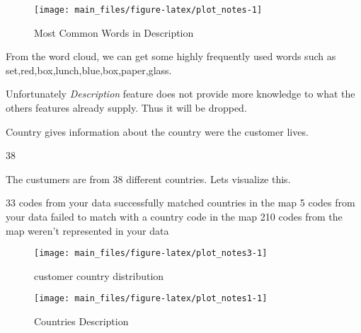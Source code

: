 \begin{Schunk}
\begin{figure}[H]

{\centering \texttt{[image: main\_files/figure-latex/plot\_notes-1]} 

}

\caption[Most Common Words in Description]{Most Common Words in Description}\label{fig:plot_notes}
\end{figure}
\end{Schunk}

From the word cloud, we can get some highly frequently used words such
as set,red,box,lunch,blue,box,paper,glass.

Unfortunately \emph{Description} feature does not provide more knowledge
to what the others features already supply. Thus it will be dropped.

Country gives information about the country were the customer lives.

\begin{Schunk}
\begin{Soutput}
[1] 38
\end{Soutput}
\end{Schunk}

The custumers are from 38 different countries. Lets visualize this.

\begin{Schunk}
\begin{Soutput}
33 codes from your data successfully matched countries in the map
5 codes from your data failed to match with a country code in the map
210 codes from the map weren't represented in your data
\end{Soutput}
\begin{figure}[H]

{\centering \texttt{[image: main\_files/figure-latex/plot\_notes3-1]} 

}

\caption[customer country distribution]{customer country distribution}\label{fig:plot_notes3}
\end{figure}
\end{Schunk}

\begin{Schunk}
\begin{figure}[H]

{\centering \texttt{[image: main\_files/figure-latex/plot\_notes1-1]} 

}

\caption[Countries Description]{Countries Description}\label{fig:plot_notes1}
\end{figure}
\end{Schunk}

